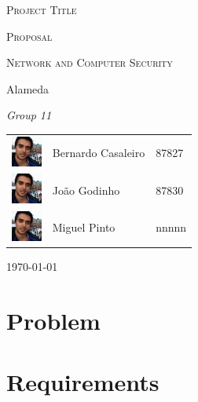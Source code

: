 \documentclass[a4paper,titlepage,11pt]{article}
\begin{document}
\begin{titlepage}
\begin{center}
  {\scshape \huge Project Title \par}                                                                         %
  \vspace{1cm}

  {\scshape \LARGE Proposal \par}
  \vspace{1.5cm}

  {\scshape \Large Network and Computer Security \par}
  \vspace{0.5cm}

  {\Large Alameda \par}
  \vfill

  {\itshape \Large Group 11 \par}
  \vfill

\begin{tabular}{l l l}
  \includegraphics[width=10mm, height=10mm]{img/bernardo.jpeg} & Bernardo Casaleiro & 87827\\
  \includegraphics[width=10mm, height=10mm]{img/bernardo.jpeg} & João Godinho & 87830\\                       %
  \includegraphics[width=10mm, height=10mm]{img/bernardo.jpeg} & Miguel Pinto & nnnnn\\                       %
\end{tabular}
  \vfill

  {\large \today\par}
\end{center}
\end{titlepage}

\section{Problem}

\section{Requirements}
\end{document}
